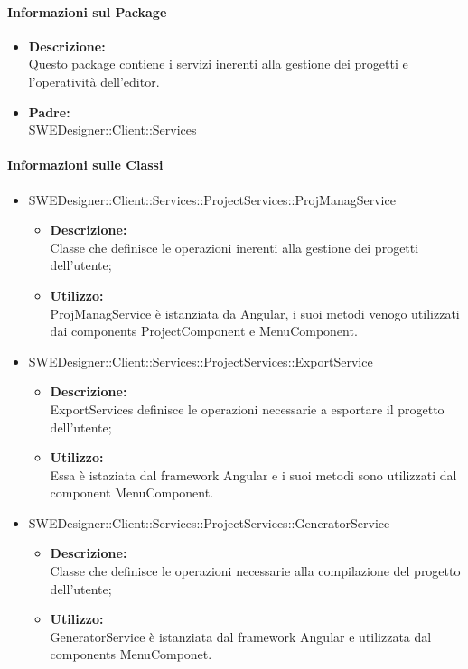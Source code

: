 		\paragraph{Informazioni sul Package}
		\begin{itemize}
			\item \textbf{Descrizione: }\\
			Questo package contiene i servizi inerenti alla gestione dei progetti e
			l'operatività dell'editor.
			\item \textbf{Padre: }\\ SWEDesigner::Client::Services
		\end{itemize}

		\paragraph{Informazioni sulle Classi}
		\begin{itemize}
			\item SWEDesigner::Client::Services::ProjectServices::ProjManagService
			\begin{itemize}
				\item \textbf{Descrizione: }\\
				Classe che definisce le operazioni inerenti alla gestione dei progetti
				dell'utente;
				\item \textbf{Utilizzo: }\\
				ProjManagService è istanziata da Angular, i suoi metodi venogo utilizzati
				dai components ProjectComponent e MenuComponent.
			\end{itemize}
			\item SWEDesigner::Client::Services::ProjectServices::ExportService
			\begin{itemize}
				\item \textbf{Descrizione: }\\
				ExportServices definisce le operazioni necessarie a esportare il progetto
				dell'utente;
				\item \textbf{Utilizzo: }\\
				Essa è istaziata dal framework Angular e i suoi metodi sono utilizzati
				dal component MenuComponent.
			\end{itemize}
			\item SWEDesigner::Client::Services::ProjectServices::GeneratorService
			\begin{itemize}
				\item \textbf{Descrizione: }\\
				Classe che definisce le operazioni necessarie alla compilazione del
				progetto dell'utente;
				\item \textbf{Utilizzo: }\\
				GeneratorService è istanziata dal framework Angular e utilizzata dal
				components MenuComponet.
			\end{itemize}
		\end{itemize}
